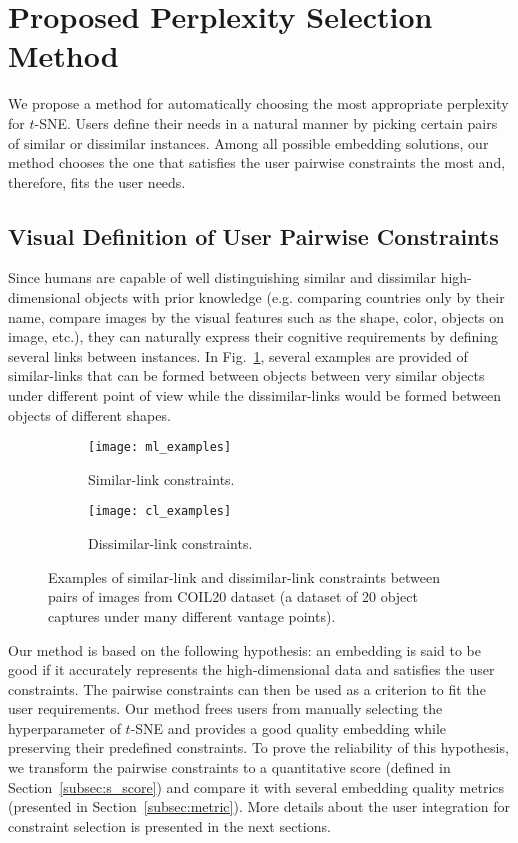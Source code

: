 \section{Proposed Perplexity Selection Method}\label{proposed_method}

We propose a method for automatically choosing the most appropriate perplexity for $t$-SNE.
Users define their needs in a natural manner by picking certain pairs of similar or dissimilar instances. Among all possible embedding solutions, our method chooses the one that satisfies the user pairwise constraints the most and, therefore, fits the user needs.

\subsection{Visual Definition of User Pairwise Constraints}

Since humans are capable of well distinguishing similar and dissimilar high-dimensional objects with prior knowledge (e.g. comparing countries only by their name, compare images by the visual features such as the shape, color, objects on image, etc.), they can naturally express their cognitive requirements by defining several links between instances.
In Fig.~\ref{fig:ml_cl_examples}, several examples are provided of similar-links that can be formed between objects between very similar objects under different point of view while the dissimilar-links would be formed between objects of different shapes.

\begin{figure}
    \centering
    \begin{subfigure}[c]{0.48\linewidth}
        \texttt{[image: ml\_examples]}
        \caption{Similar-link constraints.}
    \end{subfigure}
    \begin{subfigure}[c]{0.48\linewidth}
        \texttt{[image: cl\_examples]}
        \caption{Dissimilar-link constraints.}
    \end{subfigure}
    \caption{Examples of similar-link and dissimilar-link constraints between pairs of images from COIL20 dataset (a dataset of 20 object captures under many different vantage points).}
    \label{fig:ml_cl_examples}
\end{figure}

Our method is based on the following hypothesis: an embedding is said to be good if it accurately represents the high-dimensional data and satisfies the user constraints. The pairwise constraints can then be used as a criterion to fit the user requirements.
Our method frees users from manually selecting the hyperparameter of $t$-SNE and provides a good quality embedding while preserving their predefined constraints.
To prove the reliability of this hypothesis, we transform the pairwise constraints to a quantitative score (defined in Section~\ref{subsec:s_score}) and compare it with several embedding quality metrics (presented in Section~\ref{subsec:metric}).
More details about the user integration for constraint selection is presented in the next sections.

